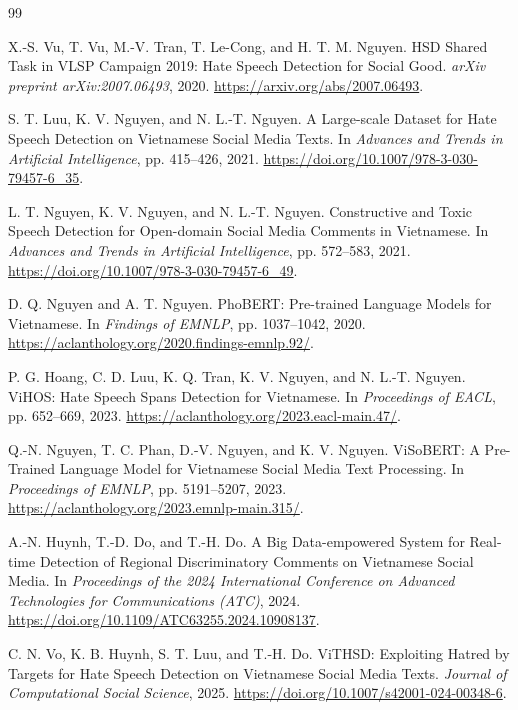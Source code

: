 \documentclass[11pt]{article}
\begin{document}
\begin{thebibliography}{99}

X.-S. Vu, T. Vu, M.-V. Tran, T. Le-Cong, and H. T. M. Nguyen.
HSD Shared Task in VLSP Campaign 2019: Hate Speech Detection for Social Good.
\emph{arXiv preprint arXiv:2007.06493}, 2020.
\url{https://arxiv.org/abs/2007.06493}.

S. T. Luu, K. V. Nguyen, and N. L.-T. Nguyen.
A Large-scale Dataset for Hate Speech Detection on Vietnamese Social Media Texts.
In \emph{Advances and Trends in Artificial Intelligence}, pp. 415--426, 2021.
\url{https://doi.org/10.1007/978-3-030-79457-6_35}.

L. T. Nguyen, K. V. Nguyen, and N. L.-T. Nguyen.
Constructive and Toxic Speech Detection for Open-domain Social Media Comments in Vietnamese.
In \emph{Advances and Trends in Artificial Intelligence}, pp. 572--583, 2021.
\url{https://doi.org/10.1007/978-3-030-79457-6_49}.

D. Q. Nguyen and A. T. Nguyen.
PhoBERT: Pre-trained Language Models for Vietnamese.
In \emph{Findings of EMNLP}, pp. 1037--1042, 2020.
\url{https://aclanthology.org/2020.findings-emnlp.92/}.

P. G. Hoang, C. D. Luu, K. Q. Tran, K. V. Nguyen, and N. L.-T. Nguyen.
ViHOS: Hate Speech Spans Detection for Vietnamese.
In \emph{Proceedings of EACL}, pp. 652--669, 2023.
\url{https://aclanthology.org/2023.eacl-main.47/}.

Q.-N. Nguyen, T. C. Phan, D.-V. Nguyen, and K. V. Nguyen.
ViSoBERT: A Pre-Trained Language Model for Vietnamese Social Media Text Processing.
In \emph{Proceedings of EMNLP}, pp. 5191--5207, 2023.
\url{https://aclanthology.org/2023.emnlp-main.315/}.

A.-N. Huynh, T.-D. Do, and T.-H. Do.
A Big Data-empowered System for Real-time Detection of Regional Discriminatory Comments on Vietnamese Social Media.
In \emph{Proceedings of the 2024 International Conference on Advanced Technologies for Communications (ATC)}, 2024.
\url{https://doi.org/10.1109/ATC63255.2024.10908137}.

C. N. Vo, K. B. Huynh, S. T. Luu, and T.-H. Do.
ViTHSD: Exploiting Hatred by Targets for Hate Speech Detection on Vietnamese Social Media Texts.
\emph{Journal of Computational Social Science}, 2025.
\url{https://doi.org/10.1007/s42001-024-00348-6}.


\end{thebibliography}
\end{document}

